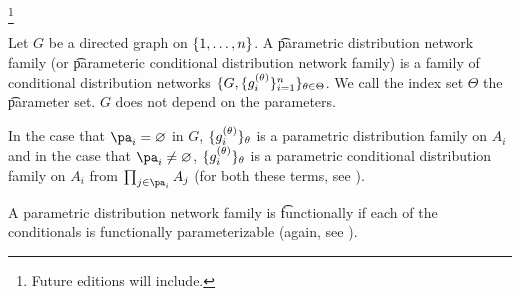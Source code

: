 
\footnote{Future editions will include.}


Let $G$ be a directed graph on $\{1,\dots, n\}$.
A \t{parametric distribution network family} (or \t{parameteric conditional distribution network family}) is a family of conditional distribution networks $\{G, \{g_i^{(\theta)}\}_{i=1}^{n}\}_{\theta \in \Theta}$.
We call the index set $\Theta$ the \t{parameter set}.
$G$ does not depend on the parameters.

In the case that $\pa_i = \emptyset$ in $G$, $\{g_i^{(\theta)}\}_\theta$ is a parametric distribution family on $A_i$ and in the case that $\pa_i \neq \emptyset$, $\{g_i^{(\theta)}\}_{\theta}$ is a parametric conditional distribution family on $A_i$ from $\prod_{j \in \pa_{i}} A_j$ (for both these terms, see ).

A parametric distribution network family is \t{functionally} if each of the conditionals is functionally parameterizable (again, see ).

\blankpage
